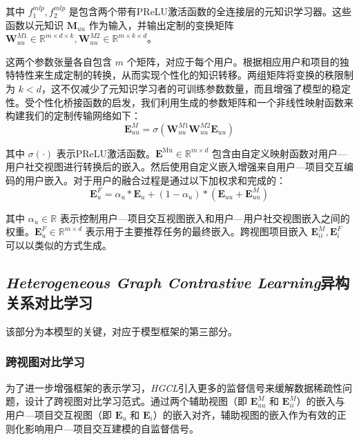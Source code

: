 \documentclass{article}
\begin{document}
其中 \( f_1^{mlp}, f_2^{mlp} \) 是包含两个带有PReLU激活函数的全连接层的元知识学习器。这些函数以元知识 \( \mathbf{M}_{uu} \) 作为输入，并输出定制的变换矩阵 \( \mathbf{W}_{uu}^{M1} \in \mathbb{R}^{m \times d \times k},\mathbf{W}_{uu}^{M2} \in \mathbb{R}^{m \times k \times d} \)。

这两个参数张量各自包含 \( m \) 个矩阵，对应于每个用户。根据相应用户和项目的独特特性来生成定制的转换，从而实现个性化的知识转移。两组矩阵将变换的秩限制为 \( k<d \)，这不仅减少了元知识学习者的可训练参数数量，而且增强了模型的稳定性。受个性化桥接函数\cite{Xia_2021}的启发，我们利用生成的参数矩阵和一个非线性映射函数来构建我们的定制传输网络如下：
\begin{equation}
\mathbf{E}_{uu}^M=\sigma(\mathbf{W}_{uu}^{M1}\mathbf{W}_{uu}^{M2}\mathbf{E}_{uu})
\end{equation}

其中 \( \sigma(\cdot) \) 表示PReLU激活函数。\( \mathbf{E}^{\text{Mu}} \in \mathbb{R}^{m \times d} \) 包含由自定义映射函数对用户—用户社交视图进行转换后的嵌入。然后使用自定义嵌入增强来自用户—项目交互编码的用户嵌入。对于用户的融合过程是通过以下加权求和完成的：
\begin{equation}
    \mathbf{E}^F_u = \alpha_u * \mathbf{E}_u + (1 - \alpha_u) * (\mathbf{E}_{uu} + \mathbf{E}^M_{uu})
\end{equation}

其中 \( \alpha_u \in \mathbb{R} \) 表示控制用户—项目交互视图嵌入和用户—用户社交视图嵌入之间的权重。\( \mathbf{E}^F_u \in \mathbb{R}^{m \times d} \) 表示用于主要推荐任务的最终嵌入。跨视图项目嵌入 \( \mathbf{E}^M_{ii}, \mathbf{E}^F_i \) 可以以类似的方式生成。

\subsection{\emph{Heterogeneous Graph Contrastive Learning}异构关系对比学习}

该部分为本模型的关键，对应于模型框架的第三部分。

\subsubsection{跨视图对比学习}

为了进一步增强框架的表示学习，\emph{HGCL}引入更多的监督信号来缓解数据稀疏性问题，设计了跨视图对比学习范式。通过两个辅助视图（即 \( \mathbf{E}^M_{uu} \) 和 \( \mathbf{E}^M_{ii} \)）的嵌入与用户—项目交互视图（即 \( \mathbf{E}_u \) 和 \( \mathbf{E}_i \)）的嵌入对齐，辅助视图的嵌入作为有效的正则化影响用户—项目交互建模的自监督信号。
\end{document}
